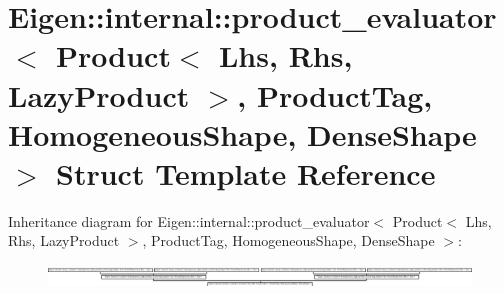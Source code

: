 \hypertarget{struct_eigen_1_1internal_1_1product__evaluator_3_01_product_3_01_lhs_00_01_rhs_00_01_lazy_produc94c394146b0a8c54b74b1b296d175015}{}\section{Eigen\+:\+:internal\+:\+:product\+\_\+evaluator$<$ Product$<$ Lhs, Rhs, Lazy\+Product $>$, Product\+Tag, Homogeneous\+Shape, Dense\+Shape $>$ Struct Template Reference}
\label{struct_eigen_1_1internal_1_1product__evaluator_3_01_product_3_01_lhs_00_01_rhs_00_01_lazy_produc94c394146b0a8c54b74b1b296d175015}
Inheritance diagram for Eigen\+:\+:internal\+:\+:product\+\_\+evaluator$<$ Product$<$ Lhs, Rhs, Lazy\+Product $>$, Product\+Tag, Homogeneous\+Shape, Dense\+Shape $>$\+:\begin{figure}[H]
\begin{center}
\leavevmode
\includegraphics[height=0.590717cm]{struct_eigen_1_1internal_1_1product__evaluator_3_01_product_3_01_lhs_00_01_rhs_00_01_lazy_produc94c394146b0a8c54b74b1b296d175015}
\end{center}
\end{figure}
